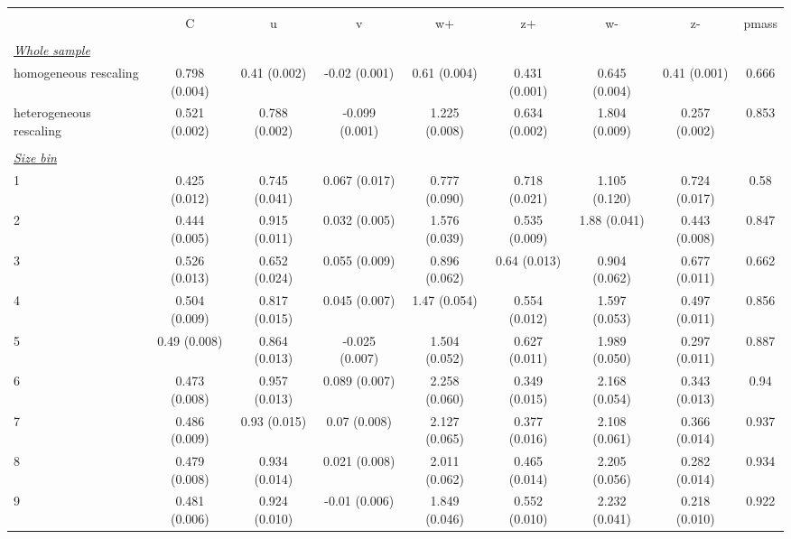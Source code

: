 
\begin{tabular}{@{\extracolsep{5pt}} l cccccccc} 
\\[-1.8ex]\hline 
\hline \\[-1.8ex] 
  & C & u & v & w+ & z+ & w- & z- & pmass \\ 
\hline \\[-1.8ex] 
\underline{{\it Whole sample}} &   &   &   &   &   &   &   &  \\ 
homogeneous rescaling & 0.798 (0.004) & 0.41 (0.002) & -0.02 (0.001) & 0.61 (0.004) & 0.431 (0.001) & 0.645 (0.004) & 0.41 (0.001) & 0.666 \\ 
heterogeneous rescaling & 0.521 (0.002) & 0.788 (0.002) & -0.099 (0.001) & 1.225 (0.008) & 0.634 (0.002) & 1.804 (0.009) & 0.257 (0.002) & 0.853 \\ 
 &   &   &   &   &   &   &   &  \\ 
\underline{{\it Size bin}} &   &   &   &   &   &   &   &  \\ 
1 & 0.425 (0.012) & 0.745 (0.041) & 0.067 (0.017) & 0.777 (0.090) & 0.718 (0.021) & 1.105 (0.120) & 0.724 (0.017) & 0.58 \\ 
2 & 0.444 (0.005) & 0.915 (0.011) & 0.032 (0.005) & 1.576 (0.039) & 0.535 (0.009) & 1.88 (0.041) & 0.443 (0.008) & 0.847 \\ 
3 & 0.526 (0.013) & 0.652 (0.024) & 0.055 (0.009) & 0.896 (0.062) & 0.64 (0.013) & 0.904 (0.062) & 0.677 (0.011) & 0.662 \\ 
4 & 0.504 (0.009) & 0.817 (0.015) & 0.045 (0.007) & 1.47 (0.054) & 0.554 (0.012) & 1.597 (0.053) & 0.497 (0.011) & 0.856 \\ 
5 & 0.49 (0.008) & 0.864 (0.013) & -0.025 (0.007) & 1.504 (0.052) & 0.627 (0.011) & 1.989 (0.050) & 0.297 (0.011) & 0.887 \\ 
6 & 0.473 (0.008) & 0.957 (0.013) & 0.089 (0.007) & 2.258 (0.060) & 0.349 (0.015) & 2.168 (0.054) & 0.343 (0.013) & 0.94 \\ 
7 & 0.486 (0.009) & 0.93 (0.015) & 0.07 (0.008) & 2.127 (0.065) & 0.377 (0.016) & 2.108 (0.061) & 0.366 (0.014) & 0.937 \\ 
8 & 0.479 (0.008) & 0.934 (0.014) & 0.021 (0.008) & 2.011 (0.062) & 0.465 (0.014) & 2.205 (0.056) & 0.282 (0.014) & 0.934 \\ 
9 & 0.481 (0.006) & 0.924 (0.010) & -0.01 (0.006) & 1.849 (0.046) & 0.552 (0.010) & 2.232 (0.041) & 0.218 (0.010) & 0.922 \\ 

\end{tabular}
